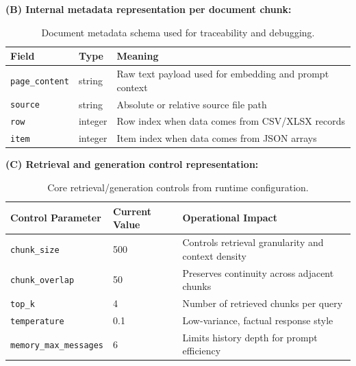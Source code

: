 \documentclass[12pt,letterpaper]{report}
\begin{document}
\textbf{(B) Internal metadata representation per document chunk:}
\begin{table}[h]
\centering
\begin{tabular}{p{}p{}p{}}
\hline
\textbf{Field} & \textbf{Type} & \textbf{Meaning} \\
\hline
\texttt{page\_content} & string & Raw text payload used for embedding and prompt context \\
\texttt{source} & string & Absolute or relative source file path \\
\texttt{row} & integer & Row index when data comes from CSV/XLSX records \\
\texttt{item} & integer & Item index when data comes from JSON arrays \\
\hline
\end{tabular}
\caption{Document metadata schema used for traceability and debugging.}
\end{table}

\textbf{(C) Retrieval and generation control representation:}
\begin{table}[h]
\centering
\begin{tabular}{p{}p{}p{}}
\hline
\textbf{Control Parameter} & \textbf{Current Value} & \textbf{Operational Impact} \\
\hline
\texttt{chunk\_size} & 500 & Controls retrieval granularity and context density \\
\texttt{chunk\_overlap} & 50 & Preserves continuity across adjacent chunks \\
\texttt{top\_k} & 4 & Number of retrieved chunks per query \\
\texttt{temperature} & 0.1 & Low-variance, factual response style \\
\texttt{memory\_max\_messages} & 6 & Limits history depth for prompt efficiency \\
\hline
\end{tabular}
\caption{Core retrieval/generation controls from runtime configuration.}
\end{table}
\end{document}
